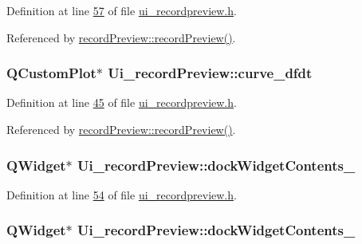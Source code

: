 Definition at line \hyperlink{a00053_source_l00057}{57} of file \hyperlink{a00053_source}{ui\+\_\+recordpreview.\+h}.



Referenced by \hyperlink{a00042_source_l00011}{record\+Preview\+::record\+Preview()}.

\hypertarget{a00028_a43d24fa14d90cc27b310542e39dcdd1b}{
\subsubsection[{curve\+\_\+dfdt}]{\setlength{\rightskip}{0pt plus 5cm}Q\+Custom\+Plot$\ast$ Ui\+\_\+record\+Preview\+::curve\+\_\+dfdt}}\label{a00028_a43d24fa14d90cc27b310542e39dcdd1b}


Definition at line \hyperlink{a00053_source_l00045}{45} of file \hyperlink{a00053_source}{ui\+\_\+recordpreview.\+h}.



Referenced by \hyperlink{a00042_source_l00052}{record\+Preview\+::record\+Preview()}.

\hypertarget{a00028_a26b0f4ae45c1aa0cfd8037f25a2f290f}{
\subsubsection[{dock\+Widget\+Contents\+\_\+3}]{\setlength{\rightskip}{0pt plus 5cm}Q\+Widget$\ast$ Ui\+\_\+record\+Preview\+::dock\+Widget\+Contents\+\_}}\label{a00028_a26b0f4ae45c1aa0cfd8037f25a2f290f}


Definition at line \hyperlink{a00053_source_l00054}{54} of file \hyperlink{a00053_source}{ui\+\_\+recordpreview.\+h}.

\hypertarget{a00028_a538c2b98d6f228a073dea0a3ddb4350e}{
\subsubsection[{dock\+Widget\+Contents\+\_\+4}]{\setlength{\rightskip}{0pt plus 5cm}Q\+Widget$\ast$ Ui\+\_\+record\+Preview\+::dock\+Widget\+Contents\+\_}}\label{a00028_a538c2b98d6f228a073dea0a3ddb4350e}


